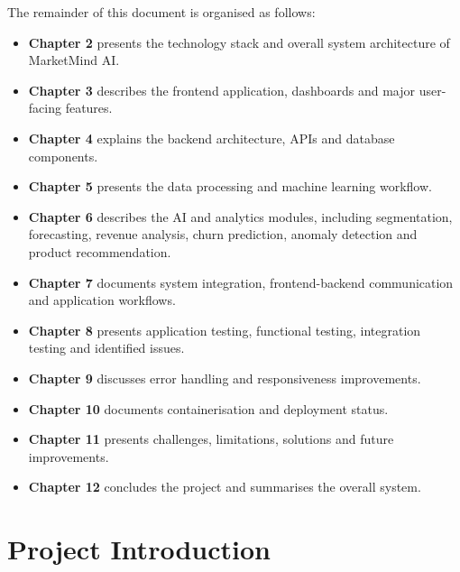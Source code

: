 \documentclass[12pt,a4paper]{report}
\begin{document}
The remainder of this document is organised as follows:

\begin{itemize}

    \item \textbf{Chapter 2} presents the technology stack and overall
    system architecture of MarketMind AI.

    \item \textbf{Chapter 3} describes the frontend application,
    dashboards and major user-facing features.

    \item \textbf{Chapter 4} explains the backend architecture,
    APIs and database components.

    \item \textbf{Chapter 5} presents the data processing and
    machine learning workflow.

    \item \textbf{Chapter 6} describes the AI and analytics modules,
    including segmentation, forecasting, revenue analysis, churn
    prediction, anomaly detection and product recommendation.

    \item \textbf{Chapter 7} documents system integration,
    frontend-backend communication and application workflows.

    \item \textbf{Chapter 8} presents application testing,
    functional testing, integration testing and identified issues.

    \item \textbf{Chapter 9} discusses error handling and
    responsiveness improvements.

    \item \textbf{Chapter 10} documents containerisation and
    deployment status.

    \item \textbf{Chapter 11} presents challenges, limitations,
    solutions and future improvements.

    \item \textbf{Chapter 12} concludes the project and summarises
    the overall system.

\end{itemize}

\newpage

\chapter{Project Introduction}
\end{document}
